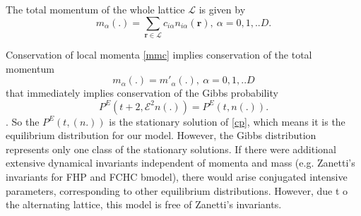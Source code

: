 The total momentum of the whole lattice $\mathcal{L}$ is given by
\begin{equation} \label{momentum}
m_{\alpha}(.) = \sum_{\bm{r} \in \mathcal{L}} c_{i\alpha} n_{i\alpha}(\bm{r}),~\alpha=0,1,..D.
\end{equation}

Conservation of local momenta \ref{mmc} implies conservation of the total momentum
\begin{equation}
m_{\alpha}(.) = m'_{\alpha}(.),~\alpha=0,1,..D
\end{equation}
that immediately implies conservation of the Gibbs probability
\begin{equation}
P^E(t+2,\mathcal{E}^2n(.)) = P^E(t,n(.)).
\end{equation}.
So the $P^E(t,(n.))$ is the stationary solution of \ref{cp}, which means it is the equilibrium distribution for our model. However, the Gibbs distribution represents only one class of the stationary solutions. If there were additional extensive dynamical invariants independent of momenta and mass (e.g. Zanetti's invariants for FHP and FCHC bmodel), there would arise conjugated intensive parameters, corresponding to other equilibrium distributions. However, due t	o the alternating lattice, this model is free of Zanetti's invariants.

\bigskip

